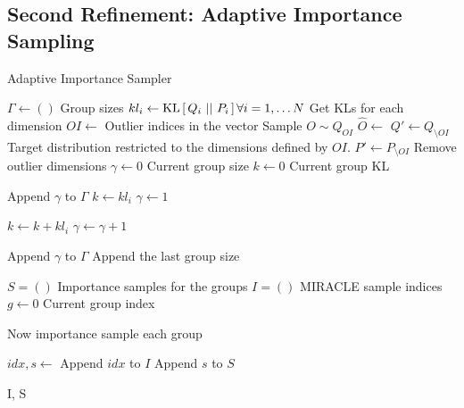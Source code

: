 \subsection{Second Refinement: Adaptive Importance Sampling}
\begin{algorithm}
  \caption{Adaptive Importance Sampler}
  \label{alg:adaptive_importance_sampler}
  \begin{algorithmic}
    \State $\Gamma \gets ()$
    \Comment Group sizes
    \State $kl_i \gets \mathrm{KL}\left[\,Q_i\,\,||\,\,P_i\,\right] \forall i = 1, \hdots N$
    \Comment Get KLs for each dimension
    \State $OI \gets $ 
    \Comment Outlier indices in the vector
    \State Sample $O \sim Q_{OI}$
    \State $\hat{O} \gets $ 
    \State $Q' \gets Q_{\setminus OI}$
    \Comment Target distribution restricted to the dimensions defined by $OI$.
    \State $P' \gets P_{\setminus OI}$
    \Comment Remove outlier dimensions
    \State $\gamma \gets 0$
    \Comment Current group size
    \State $k \gets 0$
    \Comment Current group KL



    \State Append $\gamma$ to $\Gamma$
    \State $k \gets kl_i$
    \State $\gamma \gets 1$

    \Else

    \State $k \gets k + kl_i$
    \State $\gamma \gets \gamma + 1$

    \EndIf

    \EndFor

    \State Append $\gamma$ to $\Gamma$
    \Comment Append the last group size

    \State $S = ()$
    \Comment Importance samples for the groups
    \State $I = ()$
    \Comment MIRACLE sample indices
    \State $g \gets 0$
    \Comment Current group index

    \Comment Now importance sample each group

    \State $idx, s \gets$ 
    \State Append $idx$ to $I$
    \State Append $s$ to $S$

    \EndFor

    \State \Return I, S

    \EndProcedure
  \end{algorithmic}
\end{algorithm}
